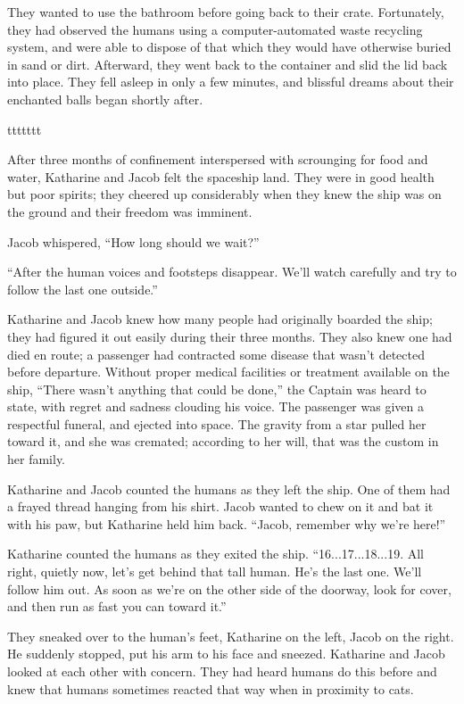 They wanted to use the bathroom before going back to their crate. Fortunately, they had observed the humans using a computer-automated waste recycling system, and were able to dispose of that which they would have otherwise buried in sand or dirt. Afterward, they went back to the container and slid the lid back into place. They fell asleep in only a few minutes, and blissful dreams about their enchanted balls began shortly after.



ttttttt


After three months of confinement interspersed with scrounging for food and water, Katharine and Jacob felt the spaceship land. They were in good health but poor spirits; they cheered up considerably when they knew the ship was on the ground and their freedom was imminent.

Jacob whispered, “How long should we wait?”

“After the human voices and footsteps disappear. We'll watch carefully and try to follow the last one outside.”

Katharine and Jacob knew how many people had originally boarded the ship; they had figured it out easily during their three months. They also knew one had died en route; a passenger had contracted some disease that wasn't detected before departure. Without proper medical facilities or treatment available on the ship, “There wasn't anything that could be done,” the Captain was heard to state, with regret and sadness clouding his voice. The passenger was given a respectful funeral, and ejected into space. The gravity from a star pulled her toward it, and she was cremated; according to her will, that was the custom in her family.

Katharine and Jacob counted the humans as they left the ship. One of them had a frayed thread hanging from his shirt. Jacob wanted to chew on it and bat it with his paw, but Katharine held him back. “Jacob, remember why we're here!”

Katharine counted the humans as they exited the ship. “16...17...18...19. All right, quietly now, let's get behind that tall human. He's the last one. We'll follow him out. As soon as we're on the other side of the doorway, look for cover, and then run as fast you can toward it.”

They sneaked over to the human's feet, Katharine on the left, Jacob on the right. He suddenly stopped, put his arm to his face and sneezed. Katharine and Jacob looked at each other with concern. They had heard humans do this before and knew that humans sometimes reacted that way when in proximity to cats.

